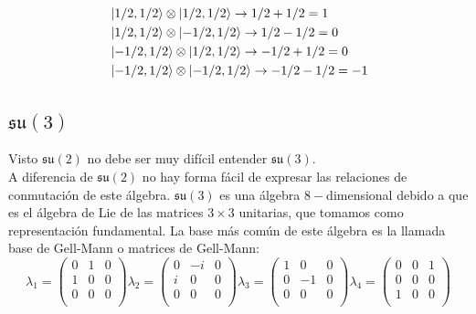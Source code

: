 \documentclass[12pt]{article}
\begin{document}
\begin{equation}
    \begin{split}
        &\ket{1/2,1/2}\otimes\ket{1/2,1/2}\rightarrow1/2+1/2=1 \\
        &\ket{1/2,1/2}\otimes\ket{-1/2,1/2}\rightarrow1/2-1/2=0 \\
        &\ket{-1/2,1/2}\otimes\ket{1/2,1/2}\rightarrow-1/2+1/2=0 \\
        &\ket{-1/2,1/2}\otimes\ket{-1/2,1/2}\rightarrow-1/2-1/2=-1
    \end{split}
\end{equation}
\subsection*{$\mathfrak{s}\mathfrak{u}(3)$}
Visto $\mathfrak{s}\mathfrak{u}(2)$ no debe ser muy difícil entender $\mathfrak{s}\mathfrak{u}(3)$.\\
A diferencia de $\mathfrak{s}\mathfrak{u}(2)$ no hay forma fácil de expresar las relaciones de conmutación de este álgebra. $\mathfrak{s}\mathfrak{u}(3)$ es una álgebra $8-$dimensional debido a que es el álgebra de Lie de las matrices $3\times 3$ unitarias, que tomamos como representación fundamental. La base más común de este álgebra es la llamada base de Gell-Mann o matrices de Gell-Mann:\\
$$
\lambda_1 =\begin{pmatrix}
    0 & 1 & 0 \\ 1 & 0 & 0\\0 &0& 0\\
\end{pmatrix}
\lambda_2 =\begin{pmatrix}
    0 & -i & 0 \\ i & 0 & 0\\ 0 &0& 0\\
\end{pmatrix}
\lambda_3 =\begin{pmatrix}
    1 & 0 & 0 \\ 0 & -1 & 0\\ 0 &0& 0\\
\end{pmatrix}
\lambda_4 =\begin{pmatrix}
    0 & 0 & 1 \\ 0 & 0 & 0\\ 1 &0& 0\\
\end{pmatrix}
$$
\end{document}
